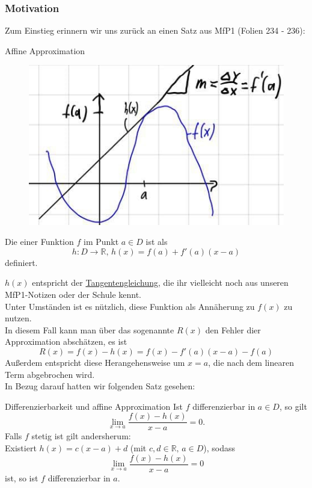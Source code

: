 \subsubsection{Motivation}
Zum Einstieg erinnern wir uns zurück an einen Satz aus MfP1 (Folien 234 - 236):
\begin{Wiederholung}
{Affine Approximation}
\begin{figure}
 \vspace{-15pt}
\includegraphics[width=.23\textwidth]{Dateien/07/07Tangentengleichung.jpg}
 \vspace{-15pt}
\end{figure}
Die  einer Funktion $f$ im Punkt $a\in D$ ist als 
\begin{equation}
    h:D\to\mathbb{R}, \,\boxed{h(x)=f(a)+f'(a)(x-a)}
\end{equation}
definiert.
\end{Wiederholung}
$h(x)$ entspricht der \underline{Tangentengleichung}, die ihr vielleicht noch aus unseren MfP1-Notizen oder der Schule kennt.\\
Unter Umständen ist es nützlich, diese Funktion als Annäherung zu $f(x)$ zu nutzen.\\
In diesem Fall kann man über das sogenannte  $R(x)$ den Fehler dier Approximation abschätzen, es ist 
\begin{equation*}
    R(x)=f(x)-h(x)=f(x)-f'(a)(x-a)-f(a)
\end{equation*}
Außerdem entspricht diese Herangehensweise um $x=a$, die nach dem linearen Term abgebrochen wird.\\
In Bezug darauf hatten wir folgenden Satz gesehen:
\begin{Wiederholung}
{Differenzierbarkeit und affine Approximation}
Ist $f$ differenzierbar in $a\in D$, so gilt
\begin{equation*}
    \lim_{x\to a}\frac{f(x)-h(x)}{x-a}=0.
\end{equation*}
Falls $f$ stetig ist gilt andersherum:\\
Existiert $h(x)=c(x-a)+d$ (mit $c,d\in\mathbb{R}, \,a\in D$), sodass 
\begin{equation*}
    \lim_{x\to a}\frac{f(x)-h(x)}{x-a}=0
\end{equation*}
ist, so ist $f$ differenzierbar in $a$.\\
\end{Wiederholung}
